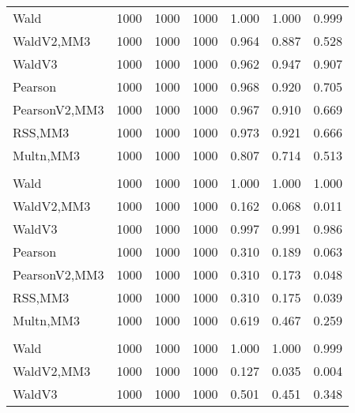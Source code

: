 \documentclass[
]{article}
\begin{document}
\begin{table}[H]
{\begin{tabular}[t]{lrrrrrr}
\hspace{1em}Wald & 1000 & 1000 & 1000 & 1.000 & 1.000 & \vphantom{1} 0.999\\
\hspace{1em}WaldV2,MM3 & 1000 & 1000 & 1000 & 0.964 & 0.887 & 0.528\\
\hspace{1em}WaldV3 & 1000 & 1000 & 1000 & 0.962 & 0.947 & 0.907\\
\hspace{1em}Pearson & 1000 & 1000 & 1000 & 0.968 & 0.920 & 0.705\\
\hspace{1em}PearsonV2,MM3 & 1000 & 1000 & 1000 & 0.967 & 0.910 & 0.669\\
\hspace{1em}RSS,MM3 & 1000 & 1000 & 1000 & 0.973 & 0.921 & 0.666\\
\hspace{1em}Multn,MM3 & 1000 & 1000 & 1000 & 0.807 & 0.714 & 0.513\\
\addlinespace[0.3em]
\multicolumn{7}{l}{\textbf{2F 10V}}\\
\hspace{1em}Wald & 1000 & 1000 & 1000 & 1.000 & 1.000 & 1.000\\
\hspace{1em}WaldV2,MM3 & 1000 & 1000 & 1000 & 0.162 & 0.068 & 0.011\\
\hspace{1em}WaldV3 & 1000 & 1000 & 1000 & 0.997 & 0.991 & 0.986\\
\hspace{1em}Pearson & 1000 & 1000 & 1000 & 0.310 & 0.189 & 0.063\\
\hspace{1em}PearsonV2,MM3 & 1000 & 1000 & 1000 & 0.310 & 0.173 & 0.048\\
\hspace{1em}RSS,MM3 & 1000 & 1000 & 1000 & 0.310 & 0.175 & 0.039\\
\hspace{1em}Multn,MM3 & 1000 & 1000 & 1000 & 0.619 & 0.467 & 0.259\\
\addlinespace[0.3em]
\multicolumn{7}{l}{\textbf{3F 15V}}\\
\hspace{1em}Wald & 1000 & 1000 & 1000 & 1.000 & 1.000 & 0.999\\
\hspace{1em}WaldV2,MM3 & 1000 & 1000 & 1000 & 0.127 & 0.035 & 0.004\\
\hspace{1em}WaldV3 & 1000 & 1000 & 1000 & 0.501 & 0.451 & 0.348\\

\end{tabular}}
\end{table}
\end{document}
